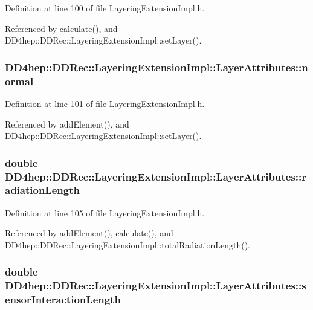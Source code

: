 Definition at line 100 of file LayeringExtensionImpl.h.

Referenced by calculate(), and DD4hep::DDRec::LayeringExtensionImpl::setLayer().\hypertarget{struct_d_d4hep_1_1_d_d_rec_1_1_layering_extension_impl_1_1_layer_attributes_a9920dfca99a6c4fc644a03ad650d1ffb}{
\subsubsection[{normal}]{ {\bf DD4hep::DDRec::LayeringExtensionImpl::LayerAttributes::normal}}}
\label{struct_d_d4hep_1_1_d_d_rec_1_1_layering_extension_impl_1_1_layer_attributes_a9920dfca99a6c4fc644a03ad650d1ffb}


Definition at line 101 of file LayeringExtensionImpl.h.

Referenced by addElement(), and DD4hep::DDRec::LayeringExtensionImpl::setLayer().\hypertarget{struct_d_d4hep_1_1_d_d_rec_1_1_layering_extension_impl_1_1_layer_attributes_ac5d8747f913962efd864c527e5f58e5b}{
\subsubsection[{radiationLength}]{\setlength{\rightskip}{0pt plus 5cm}double {\bf DD4hep::DDRec::LayeringExtensionImpl::LayerAttributes::radiationLength}}}
\label{struct_d_d4hep_1_1_d_d_rec_1_1_layering_extension_impl_1_1_layer_attributes_ac5d8747f913962efd864c527e5f58e5b}


Definition at line 105 of file LayeringExtensionImpl.h.

Referenced by addElement(), calculate(), and DD4hep::DDRec::LayeringExtensionImpl::totalRadiationLength().\hypertarget{struct_d_d4hep_1_1_d_d_rec_1_1_layering_extension_impl_1_1_layer_attributes_a3fab0dd2b11df5f60de6355c0b83ca44}{
\subsubsection[{sensorInteractionLength}]{\setlength{\rightskip}{0pt plus 5cm}double {\bf DD4hep::DDRec::LayeringExtensionImpl::LayerAttributes::sensorInteractionLength}}}
\label{struct_d_d4hep_1_1_d_d_rec_1_1_layering_extension_impl_1_1_layer_attributes_a3fab0dd2b11df5f60de6355c0b83ca44}


